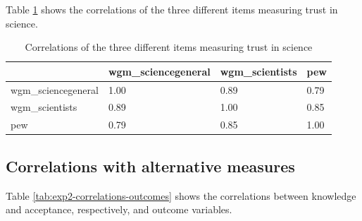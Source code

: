 \documentclass[
  doc,floatsintext]{apa6}
\begin{document}
Table \ref{tab:exp2-correlation-trust} shows the correlations of the three different items measuring trust in science.

\begin{table}[h]

\begin{center}
\begin{threeparttable}

\caption{\label{tab:exp2-correlation-trust}Correlations of the three different items measuring trust in science}

\begin{tabular}{llll}
\toprule
 & \multicolumn{1}{c}{wgm\_sciencegeneral} & \multicolumn{1}{c}{wgm\_scientists} & \multicolumn{1}{c}{pew}\\
\midrule
wgm\_sciencegeneral & 1.00 & 0.89 & 0.79\\
wgm\_scientists & 0.89 & 1.00 & 0.85\\
pew & 0.79 & 0.85 & 1.00\\
\bottomrule
\end{tabular}

\end{threeparttable}
\end{center}

\end{table}

\subsection{Correlations with alternative measures}\label{correlations-with-alternative-measures-1}

Table \ref{tab:exp2-correlations-outcomes} shows the correlations between knowledge and acceptance, respectively, and outcome variables.
\end{document}
